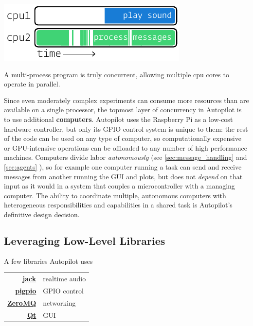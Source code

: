 \begin{marginfigure}[0.1cm]
 \includegraphics[]{figures/side_14_multiprocess.pdf}
 \caption{A multi-process program is truly concurrent, allowing multiple cpu cores to operate in parallel.}
 \label{fig:multiprocess}
\end{marginfigure}

Since even moderately complex experiments can consume more resources than are available on a single processor, the topmost layer of concurrency in Autopilot is to use additional \textbf{computers}. Autopilot uses the Raspberry Pi as a low-cost hardware controller, but only its GPIO control system is unique to them: the rest of the code can be used on any type of computer, so computationally expensive or GPU-intensive operations can be offloaded to any number of high performance machines. Computers divide labor \textit{autonomously} (see \ref{sec:message_handling} and \ref{sec:agents} ), so for example one computer running a task can send and receive messages from another running the GUI and plots, but does not \textit{depend} on that input as it would in a system that couples a microcontroller with a managing computer. The ability to coordinate multiple, autonomous computers with heterogeneous responsibilities and capabilities in a shared task is Autopilot's definitive design decision.



\subsection{Leveraging Low-Level Libraries}
\label{sec:lowlevel}

\begin{margintable}[1.85cm]
\caption{A few libraries Autopilot uses}
\label{tab:libraries}
\noindent\begin{tabularx}{\linewidth}{rX}
\toprule
 \textbf{\href{http://jackaudio.org/}{jack}} & realtime audio \\
 \textbf{\href{http://abyz.me.uk/rpi/pigpio/index.html}{pigpio}} & GPIO control \\
 \textbf{\href{http://zeromq.org/}{ZeroMQ}} & networking \\
 \textbf{\href{https://www.qt.io/}{Qt}} & GUI \\
 \bottomrule
\end{tabularx}
\end{margintable}

